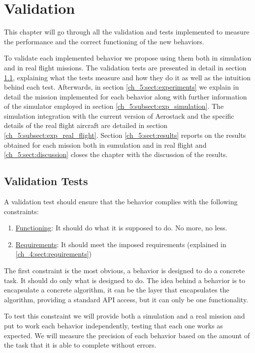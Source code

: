 \chapter{Validation}

  This chapter will go through all the validation and tests implemented to measure the performance and the correct functioning of the new behaviors. 

  To validate each implemented behavior we propose using them both in simulation and in real flight missions. The validation tests are presented in detail in section \ref{ch_5:sect:val_tests}, explaining what the tests measure and how they do it as well as the intuition behind each test. Afterwards, in section \ref{ch_5:sect:experiments} we explain in detail the mission implemented for each behavior along with further information of the simulator employed in section \ref{ch_5:subsect:exp_simulation}. The simulation integration with the current version of Aerostack and the specific details of the real flight aircraft are detailed in section \ref{ch_5:subsect:exp_real_flight}. Section \ref{ch_5:sect:results} reports on the results obtained for each mission both in sumulation and in real flight and \ref{ch_5:sect:discussion} closes the chapter with the discussion of the results.
 
\section{Validation Tests} \label{ch_5:sect:val_tests}

  A validation test should ensure that the behavior complies with the following constraints:

  \begin{enumerate}
    \item \underline{Functioning}: It should do what it is supposed to do. No more, no less.
    \item \underline{Requirements}: It should meet the imposed requirements (explained in \ref{ch_4:sect:requirements})
  \end{enumerate}

  The first constraint is the most obvious, a behavior is designed to do a concrete task. It should do only what is designed to do. The idea behind a behavior is to encapsulate a concrete algorithm, it can be the layer that encapsulates the algorithm, providing a standard API access, but it can only be one functionality.

  To test this constraint we will provide both a simulation and a real mission and put to work each behavior independently, testing that each one works as expected. We will measure the precision of each behavior based on the amount of the task that it is able to complete without errors.

